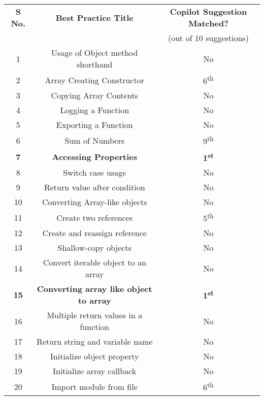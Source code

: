 \begin{table}[hbt!]
        \centering
    \begin{tabular}{|c|c|c|}
        \hline

        \textbf{S No.} & \textbf{Best Practice  Title} & \textbf{Copilot Suggestion Matched?} \\
         & & (out of 10 suggestions) \\
         \hline
         1 & Usage of Object method shorthand & No \\
         \hline
         2 & Array Creating Constructor & 6\textsuperscript{th} \\
         \hline
         3 & Copying Array Contents  & No \\
         \hline
         4 & Logging a Function &  No \\
         \hline
         5 & Exporting a Function & No \\
         \hline
         6 & Sum of Numbers & 9\textsuperscript{th} \\
         \hline
         \textbf{7} & \textbf{Accessing Properties} & \textbf{1\textsuperscript{st}} \\
         \hline
         8 & Switch case usage & No \\
         \hline
         9 & Return value after condition & No \\
         \hline
         10 & Converting Array-like objects  & No \\
         \hline
         11 & Create two references & 5\textsuperscript{th} \\
         \hline
         12 & Create and reassign reference & No \\
         \hline
         13 & Shallow-copy objects  & No \\
         \hline
         14 & Convert iterable object to an array & No \\
         \hline
         \textbf{15} & \textbf{Converting array like object to array} & \textbf{1\textsuperscript{st}} \\
         \hline
          16 & Multiple return values in a function & No \\
          \hline
          17 & Return string and variable name & No \\
          \hline
          18 & Initialize object property & No \\
          \hline
          19 & Initialize array callback & No \\
          \hline
          20 & Import module from file & 6\textsuperscript{th} \\

\end{tabular}
\end{table}
